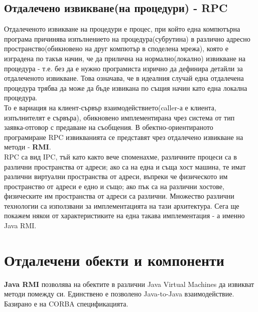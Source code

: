 \documentclass[11pt]{article} %
\begin{document}
\subsection{Отдалечено извикване(на процедури) - RPC}
Отдалеченото извикване на процедури е процес, при който една компютърна програма причинява изпълнението на процедура(субрутина) в различно адресно пространство(обикновено на друг компютър в споделена мрежа), която е изградена по такъв начин, че да прилична на нормално(локално) извикване на процедура - т.е. без да е нужно програмиста изрично да дефинира детайли за отдалеченото извикване. Това означава, че в идеалния случай една отдалечена процедура трябва да може да бъде извикана по същия начин като една локална процедура.\\
То е вариация на клиент-сървър взаимодействието(caller-а е клиента, изпълнителят е сървъра), обикновено имплементирана чрез система от тип заявка-отговор с предаване на съобщения. В обектно-ориентираното програмиране RPC извикванията се представят чрез отдалечено извикване на методи - \textbf{RMI}.\\
RPC са вид IPC, тъй като както вече споменахме, различните процеси са в различни пространства от адреси; ако са на една и съща хост машина, те имат различни виртуални пространства от адреси, въпреки че физическото им пространство от адреси е едно и също; ако пък са на различни хостове, физическите им пространства от адреси са различни. Множество различни технологии са използвани за имплементацията на тази архитектура. Сега ще покажем някои от характеристиките на една такава имплементация - а именно Java RMI.

\section{Отдалечени обекти и компоненти}
\textbf{Java RMI} позволява на обектите в различни Java Virtual Machines да извикват методи помежду си. Единствено е позволено Java-to-Java взаимодействие. Базирано е на CORBA спецификацията. 
\end{document}

